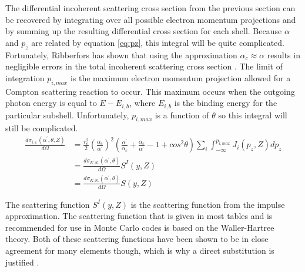 The differential incoherent scattering cross section from the previous section
can be recovered by integrating over all possible electron momentum projections
and by summing up the resulting differential cross section for each shell.
Because $\alpha$ and $p_z$ are related by equation \ref{eq:pz}, this integral
will be quite complicated. Fortunately, Ribberfors has shown that using the
approximation $\alpha_c \approx \alpha$ results in negligible errors in the 
total incoherent scattering cross section \citep{ribberfors_x-ray_1983}. The
limit of integration $p_{i,max}$ is the maximum electron momentum projection
allowed for a Compton scattering reaction to occur. This maximum occurs when
the outgoing photon energy is equal to $E - E_{i,b}$, where $E_{i,b}$ is the 
binding energy for the particular subshell. Unfortunately, $p_{i,max}$ is a 
function of $\theta$ so this integral will still be complicated. 
\begin{align}
  \frac{d\sigma_{i.s.}(\alpha^{'},\theta,Z)}{d\Omega} & = 
  \frac{r_e^2}{2} \left(\frac{\alpha_c}{\alpha^{'}}\right)^2 
  \left(\frac{\alpha^{'}}{\alpha_c} + \frac{\alpha_c}{\alpha^{'}} - 1 + 
  cos^2\theta \right) \sum_i \int_{-\infty}^{p_{i,max}} J_i(p_z,Z)dp_z \nonumber \\
  & = \frac{d\sigma_{K.N.}(\alpha^{'},\theta)}{d\Omega} S^I(y,Z) \nonumber \\
  & = \frac{d\sigma_{K.N.}(\alpha^{'},\theta)}{d\Omega} S(y,Z) \nonumber
\end{align}

The scattering function $S^I(y,Z)$ is the scattering function from the
impulse approximation. The scattering function that is given in most tables
and is recommended for use in Monte Carlo codes is based on the Waller-Hartree
theory. Both of these scattering functions have been shown to be in close 
agreement for many elements though, which is why a direct substitution is 
justified \citep{namito_implementation_1994}. 

